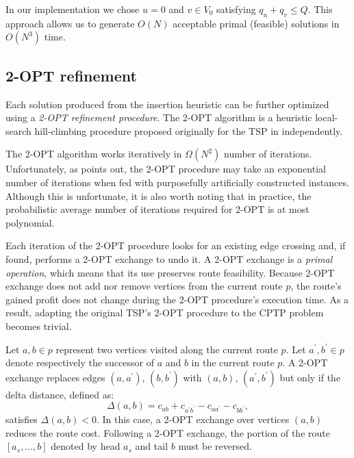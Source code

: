 In our implementation we chose $u = 0$ and $v \in V_0$ satisfying $q_u + q_v \le Q$.
This approach allows us to generate $O(N)$ acceptable primal (feasible) solutions in $O(N^3)$ time.

\subsection{2-OPT refinement}
\label{sec:impl-2opt-refinement}

Each solution produced from the insertion heuristic
can be further optimized using a \textit{2-OPT refinement procedure}.
The 2-OPT algorithm is a heuristic local-search hill-climbing procedure
proposed originally for the TSP in \textcite{flood1956, croes1958} independently.

The 2-OPT algorithm works iteratively in $\Omega(N^2)$ number of iterations.
Unfortunately,
as \textcite{chandra1999} points out,
the 2-OPT procedure may take an exponential number of iterations
when fed with purposefully artificially constructed instances.
Although this is unfortunate, it is also worth noting that in practice,
the probabilistic average number of iterations required for 2-OPT is at most polynomial.

Each iteration of the 2-OPT procedure looks for an existing edge crossing and, if found,
performs a 2-OPT exchange to undo it.
A 2-OPT exchange is a \textit{primal operation},
which means that its use preserves route feasibility.
Because 2-OPT exchange does not add nor remove vertices from the current route $p$,
the route's gained profit does not change during
the 2-OPT procedure's execution time.
As a result, adapting the original TSP's 2-OPT procedure to the CPTP problem becomes trivial.

Let $a, b \in p$ represent two vertices visited along the current route $p$.
Let $a^\prime, b^\prime \in p$ denote respectively the successor of $a$ and $b$ in the current route $p$.
A 2-OPT exchange replaces edges $(a, a^\prime)$, $(b, b^\prime)$
with $(a, b)$, $(a^\prime, b^\prime)$
but only if the delta distance, defined as:
\begin{equation}
	\Delta(a, b) = c_{a b} + c_{a^\prime b^\prime} - c_{a a^\prime} - c_{b b^\prime},
\end{equation}
satisfies $\Delta(a, b) < 0$.
In this case, a 2-OPT exchange over vertices $(a, b)$ reduces the route cost.
Following a 2-OPT exchange, the portion of the route $[a_s, \dots, b]$
denoted by head $a_s$ and tail $b$ must be reversed.

